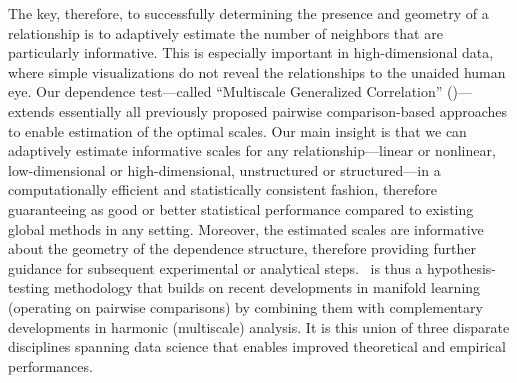 \documentclass[11pt]{article}
\begin{document}
  
  
The key, therefore, to successfully determining the presence and geometry of a relationship is to adaptively estimate the number of neighbors that are particularly informative.
This is especially important in high-dimensional data, where simple visualizations do not reveal the relationships to the unaided human eye.
Our  dependence test---called ``Multiscale Generalized Correlation'' (\Mgc)---extends essentially all previously proposed pairwise comparison-based approaches to enable estimation of the  optimal scales.   
{Our main insight is that we can adaptively estimate informative scales for any relationship---linear or nonlinear, low-dimensional or high-dimensional, unstructured or structured---in a computationally efficient and statistically consistent fashion, therefore guaranteeing as good or better  statistical performance compared to existing global methods in {any} setting.}
Moreover, the estimated scales are informative about the geometry of the dependence structure, therefore providing further guidance for subsequent experimental or analytical steps. \Mgc~is thus a hypothesis-testing methodology that builds on recent developments in manifold learning (operating on pairwise comparisons) by combining them with complementary developments in harmonic (multiscale) analysis. 
It is this union of three disparate disciplines spanning data science that enables improved theoretical and empirical performances. 



\end{document}
